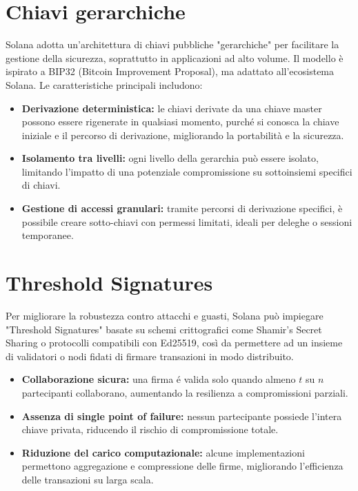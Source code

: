 \documentclass[a4paper,12pt]{report}
\begin{document}
	\section{Chiavi gerarchiche}
	Solana adotta un’architettura di chiavi pubbliche "gerarchiche" per facilitare la gestione della sicurezza, soprattutto in applicazioni ad alto volume. Il modello è ispirato a BIP32 (Bitcoin Improvement Proposal), ma adattato all’ecosistema Solana. Le caratteristiche principali includono:
	
	\begin{itemize}
		\item \textbf{Derivazione deterministica:} le chiavi derivate da una chiave master possono essere rigenerate in qualsiasi momento, purché si conosca la chiave iniziale e il percorso di derivazione, migliorando la portabilità e la sicurezza.
		\item \textbf{Isolamento tra livelli:} ogni livello della gerarchia può essere isolato, limitando l’impatto di una potenziale compromissione su sottoinsiemi specifici di chiavi.
		\item \textbf{Gestione di accessi granulari:} tramite percorsi di derivazione specifici, è possibile creare sotto-chiavi con permessi limitati, ideali per deleghe o sessioni temporanee.
	\end{itemize}
	
	\section{Threshold Signatures}
	Per migliorare la robustezza contro attacchi e guasti, Solana può impiegare "Threshold Signatures" basate su schemi crittografici come Shamir’s Secret Sharing o protocolli compatibili con Ed25519, così da permettere ad un insieme di validatori o nodi fidati di firmare transazioni in modo distribuito.
	
	\begin{itemize}
		\item \textbf{Collaborazione sicura:} una firma é valida solo quando almeno \( t \) su \( n \) partecipanti collaborano, aumentando la resilienza a compromissioni parziali.
		\item \textbf{Assenza di single point of failure:} nessun partecipante possiede l’intera chiave privata, riducendo il rischio di compromissione totale.
		\item \textbf{Riduzione del carico computazionale:} alcune implementazioni permettono aggregazione e compressione delle firme, migliorando l’efficienza delle transazioni su larga scala.
	\end{itemize}
	
\end{document}
